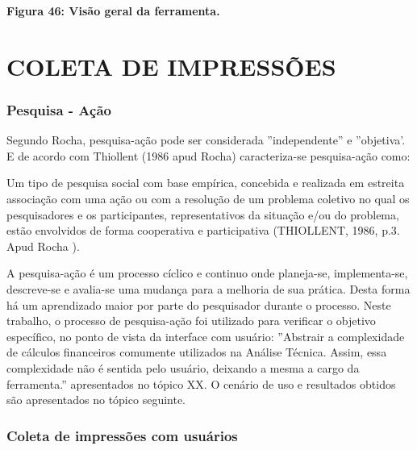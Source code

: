 \textbf{Figura 46: Visão geral da ferramenta.}

\section{COLETA DE IMPRESSÕES}
\subsubsection{Pesquisa - Ação}
Segundo Rocha, pesquisa-ação pode ser considerada ''independente'' e ''objetiva'. E de acordo com Thiollent (1986 apud Rocha) caracteriza-se pesquisa-ação como:
\begin{citacao}
Um tipo de pesquisa social com base empírica, concebida e realizada em estreita associação com uma ação ou com a resolução de um problema coletivo no qual os pesquisadores e os participantes, representativos da situação e/ou do problema, estão envolvidos de forma cooperativa e participativa (THIOLLENT, 1986, p.3. Apud Rocha ).
\end{citacao}

A pesquisa-ação é um processo cíclico e continuo onde planeja-se, implementa-se, descreve-se e avalia-se uma mudança para a melhoria de sua prática. Desta forma há um aprendizado maior por parte do pesquisador durante o processo. Neste trabalho, o processo de pesquisa-ação foi utilizado para verificar o objetivo específico, no ponto de vista da interface com usuário: ''Abstrair a complexidade de cálculos financeiros comumente utilizados na Análise Técnica. Assim, essa complexidade não é sentida pelo usuário, deixando a mesma a cargo da ferramenta.'' apresentados no tópico XX. O cenário de uso e resultados obtidos são apresentados no tópico seguinte.


\subsubsection{Coleta de impressões com usuários}

